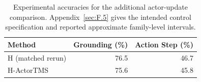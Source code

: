 \begin{table}[!htbp]
\centering
\small
\setlength{\tabcolsep}{5pt}
\renewcommand{\arraystretch}{1.13}
\renewcommand{\thetable}{F.\arabic{table}}
\renewcommand{\theHtable}{F.\arabic{table}}
\setcounter{table}{5}
\begin{tabular}{lrr}
\toprule
Method & Grounding (\%) & Action Step (\%) \\
\midrule
H (matched rerun) & 76.5 & 46.7 \\
H-ActorTMS & 75.6 & 45.8 \\
\bottomrule
\end{tabular}
\caption{Experimental accuracies for the additional actor-update comparison. Appendix~\ref{sec:F.5} gives the intended control specification and reported approximate family-level intervals.}
\label{tab:F.6}
\end{table}
